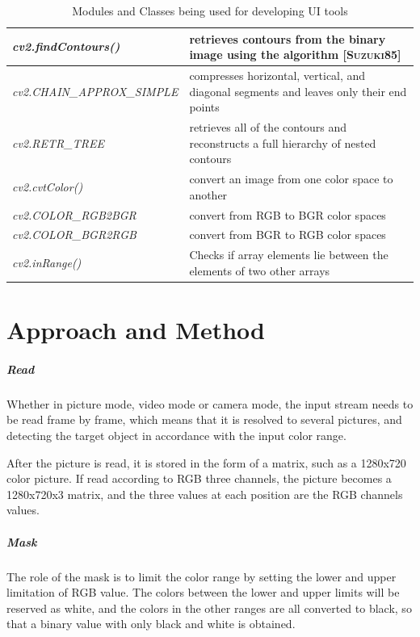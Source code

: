 \documentclass[a4paper, twoside]{report}
\begin{document}
{{\begin{table}[h!]
\begin{tabular}{ m{5cm}| m{}  }
\textit{cv2.findContours()} &retrieves contours from the binary image using the algorithm \textsc{[Suzuki85]} \\
\hline
\textit{cv2.CHAIN{\_}APPROX{\_}SIMPLE} &compresses horizontal, vertical, and diagonal segments and leaves only their end points \\
\hline
\textit{cv2.RETR{\_}TREE} &retrieves all of the contours and reconstructs a full hierarchy of nested contours \\
\hline

\textit{cv2.cvtColor()} &convert an image from one color space to another \\
\hline
\textit{cv2.COLOR{\_}RGB2BGR} &convert from RGB to BGR color spaces  \\
\hline
\textit{cv2.COLOR{\_}BGR2RGB} &convert from BGR to RGB color spaces  \\
\hline

\textit{cv2.inRange()} &Checks if array elements lie between the elements of two other arrays \\
\end{tabular}
\caption{Modules and Classes being used for developing UI tools}
\end{table} \quad

\chapter{Approach and Method}
\paragraph{Read} Whether in picture mode, video mode or camera mode, the input stream needs to be read frame by frame, which means that it is resolved to several pictures, and detecting the target object in accordance with the input color range.      \\ \par

\noindent After the picture is read, it is stored in the form of a matrix, such as a 1280x720 color picture. If read according to RGB three channels, the picture becomes a 1280x720x3 matrix, and the three values at each position are the RGB channels values.     \\ \par

\paragraph{Mask} The role of the mask is to limit the color range by setting the lower and upper limitation of RGB value. The colors between the lower and upper limits will be reserved as white, and the colors in the other ranges are all converted to black, so that a binary value with only black and white is obtained.      \\ \par

}}
\end{document}
